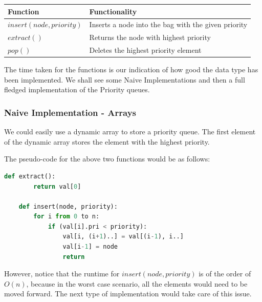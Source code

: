 \documentclass{article}
\theoremstyle{definition}
\theoremstyle{example}
\begin{document}
\begin{center}
 \begin{tabular}{| m{10em} | m{17em} |} 
 \hline
 \textbf{Function} & \textbf{Functionality} \\ [0.5ex] 
 \hline
 $insert(node, priority)$ & Inserts a node into the bag with the given priority \\ 
 \hline
 $extract()$ & Returns the node with highest priority\\
 \hline
 $pop()$ & Deletes the highest priority element\\
 \hline
 \end{tabular}
\end{center}
\vspace{4mm}
\hspace{4mm}The time taken for the functions is our indication of how good the data type has been implemented. We shall see some Naive Implementations and then a full fledged implementation of the Priority queues.

\subsubsection{\Large Naive Implementation - Arrays}
\hspace{4mm}We could easily use a dynamic array to store a priority queue. The first element of the dynamic array stores the element with the highest priority. \par
\vspace{4mm}
The pseudo-code for the above two functions would be as follows:
\begin{lstlisting}[language = python, basicstyle = \Large]
    def extract():
        return val[0]
    
    def insert(node, priority):
        for i from 0 to n:
            if (val[i].pri < priority):
                val[i, (i+1)..] = val[(i-1), i..]
                val[i-1] = node
                return
\end{lstlisting}

However, notice that the runtime for $insert(node, priority)$ is of the order of $O(n)$, because in the worst case scenario, all the elements would need to be moved forward. The next type of implementation would take care of this issue.
\end{document}

